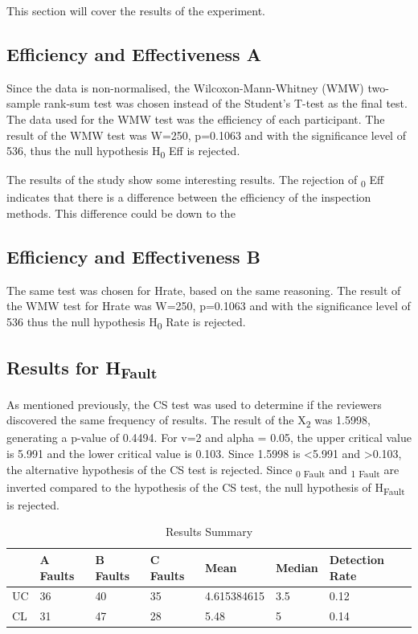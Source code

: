 \documentclass[10pt,twocolumn]{article}
\begin{document}
This section will cover the results of the experiment.

\subsection{Efficiency and Effectiveness A}
Since the data is non-normalised, the Wilcoxon-Mann-Whitney (WMW) two-sample rank-sum test was chosen instead of the Student's T-test as the final test. The data used for the WMW test was the efficiency of each participant. The result of the WMW test was W=250, p=0.1063 and with the significance level of 536, thus the null hypothesis H\textsubscript{0} Eff is rejected. 

The results of the study show some interesting results. The rejection of \textsubscript{0} Eff indicates that there is a difference between the efficiency of the inspection methods. This difference could be down to the

\subsection{Efficiency and Effectiveness B}
The same test was chosen for Hrate, based on the same reasoning. The result of the WMW test for Hrate was W=250, p=0.1063 and with the significance level of 536 thus the null hypothesis H\textsubscript{0} Rate is rejected. 


\subsection{Results for H\textsubscript{Fault}}
As mentioned previously, the CS test was used to determine if the reviewers discovered the same frequency of results. The result of the X\textsubscript{2} was 1.5998, generating a p-value of 0.4494. For v=2 and alpha = 0.05, the upper critical value is 5.991 and the lower critical value is 0.103. Since 1.5998 is \textless 5.991 and \textgreater 0.103, the alternative hypothesis of the CS test is rejected. Since \textsubscript{0 Fault} and \textsubscript{1 Fault} are inverted compared to the hypothesis of the CS test, the null hypothesis of H\textsubscript{Fault} is rejected. 



\begin{table}
	\centering
	\begin{tabular}[Ht]{| l | l | l | l | l | l | l |}
	\hline
	 & A Faults & B Faults & C Faults & Mean & Median & Detection Rate\\
	\hline
	UC & 36 & 40 & 35 & 4.615384615 & 3.5 & 0.12 \\
	\hline
	CL & 31 & 47 & 28 & 5.48 & 5 & 0.14 \\
	\hline
	\end{tabular}
	\caption{Results Summary}
\end{table}
\end{document}
